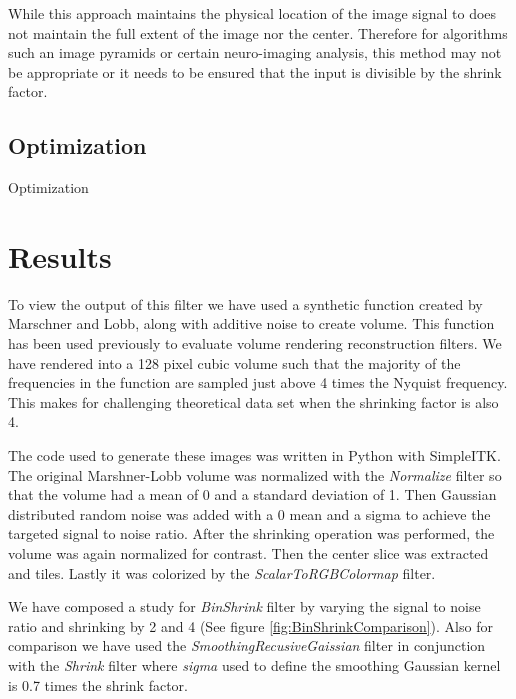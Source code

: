 \documentclass{InsightArticle}
\begin{document}
While this approach maintains the physical location of the image
signal to does not maintain the full extent of the image nor the
center. Therefore for algorithms such an image pyramids or certain
neuro-imaging analysis, this method may not be appropriate or it
needs to be ensured that the input is divisible by the shrink factor.

\subsection{Optimization}
Optimization 


\section{Results}

To view the output of this filter we have used a synthetic function
created by Marschner and Lobb\cite{MarschnerL94}, along with additive
noise to create volume. This function has been used previously to
evaluate volume rendering reconstruction filters. We have rendered
into a 128 pixel cubic volume such that the majority of the frequencies in
the function are sampled just above 4 times the Nyquist frequency. This makes
for challenging theoretical data set when the shrinking factor is also
4.

The code used to generate these images was written in Python with
SimpleITK. The original Marshner-Lobb volume was normalized with the 
\textit{Normalize} filter so that the volume had a mean
of 0 and a standard deviation of 1. Then Gaussian distributed random
noise was added with a 0 mean and a sigma to achieve the targeted
signal to noise ratio. After the shrinking operation was performed,
the volume was again normalized for contrast. Then the center slice
was extracted and tiles. Lastly it was colorized by the
\textit{ScalarToRGBColormap} filter\cite{Tustison2009}.

We have composed a study for \textit{BinShrink} filter by varying the
signal to noise ratio and shrinking by 2 and 4 (See figure
\ref{fig:BinShrinkComparison}). Also for comparison we have used the
\textit{SmoothingRecusiveGaissian} filter in conjunction with the
\textit{Shrink} filter where \textit{sigma} used to define the
smoothing Gaussian kernel is 0.7 times the shrink factor. 
\end{document}
